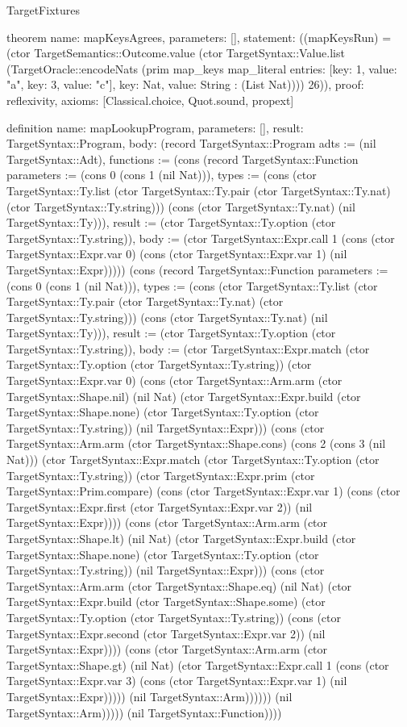 \begin{lexlean}{TargetFixtures}
\begin{semanticmodule}
theorem{
  name: mapKeysAgrees,
  parameters: [],
  statement: ((mapKeysRun) = (ctor TargetSemantics::Outcome.value (ctor TargetSyntax::Value.list (TargetOracle::encodeNats (prim map_keys map_literal{
    entries: [{key: 1, value: "a"}, {key: 3, value: "c"}],
    key: Nat,
    value: String
  } : (List Nat)))) 26)),
  proof: reflexivity{},
  axioms: [Classical.choice, Quot.sound, propext]
}

definition{
  name: mapLookupProgram,
  parameters: [],
  result: TargetSyntax::Program,
  body: (record TargetSyntax::Program {adts := (nil TargetSyntax::Adt), functions := (cons (record TargetSyntax::Function {parameters := (cons 0 (cons 1 (nil Nat))), types := (cons (ctor TargetSyntax::Ty.list (ctor TargetSyntax::Ty.pair (ctor TargetSyntax::Ty.nat) (ctor TargetSyntax::Ty.string))) (cons (ctor TargetSyntax::Ty.nat) (nil TargetSyntax::Ty))), result := (ctor TargetSyntax::Ty.option (ctor TargetSyntax::Ty.string)), body := (ctor TargetSyntax::Expr.call 1 (cons (ctor TargetSyntax::Expr.var 0) (cons (ctor TargetSyntax::Expr.var 1) (nil TargetSyntax::Expr))))}) (cons (record TargetSyntax::Function {parameters := (cons 0 (cons 1 (nil Nat))), types := (cons (ctor TargetSyntax::Ty.list (ctor TargetSyntax::Ty.pair (ctor TargetSyntax::Ty.nat) (ctor TargetSyntax::Ty.string))) (cons (ctor TargetSyntax::Ty.nat) (nil TargetSyntax::Ty))), result := (ctor TargetSyntax::Ty.option (ctor TargetSyntax::Ty.string)), body := (ctor TargetSyntax::Expr.match (ctor TargetSyntax::Ty.option (ctor TargetSyntax::Ty.string)) (ctor TargetSyntax::Expr.var 0) (cons (ctor TargetSyntax::Arm.arm (ctor TargetSyntax::Shape.nil) (nil Nat) (ctor TargetSyntax::Expr.build (ctor TargetSyntax::Shape.none) (ctor TargetSyntax::Ty.option (ctor TargetSyntax::Ty.string)) (nil TargetSyntax::Expr))) (cons (ctor TargetSyntax::Arm.arm (ctor TargetSyntax::Shape.cons) (cons 2 (cons 3 (nil Nat))) (ctor TargetSyntax::Expr.match (ctor TargetSyntax::Ty.option (ctor TargetSyntax::Ty.string)) (ctor TargetSyntax::Expr.prim (ctor TargetSyntax::Prim.compare) (cons (ctor TargetSyntax::Expr.var 1) (cons (ctor TargetSyntax::Expr.first (ctor TargetSyntax::Expr.var 2)) (nil TargetSyntax::Expr)))) (cons (ctor TargetSyntax::Arm.arm (ctor TargetSyntax::Shape.lt) (nil Nat) (ctor TargetSyntax::Expr.build (ctor TargetSyntax::Shape.none) (ctor TargetSyntax::Ty.option (ctor TargetSyntax::Ty.string)) (nil TargetSyntax::Expr))) (cons (ctor TargetSyntax::Arm.arm (ctor TargetSyntax::Shape.eq) (nil Nat) (ctor TargetSyntax::Expr.build (ctor TargetSyntax::Shape.some) (ctor TargetSyntax::Ty.option (ctor TargetSyntax::Ty.string)) (cons (ctor TargetSyntax::Expr.second (ctor TargetSyntax::Expr.var 2)) (nil TargetSyntax::Expr)))) (cons (ctor TargetSyntax::Arm.arm (ctor TargetSyntax::Shape.gt) (nil Nat) (ctor TargetSyntax::Expr.call 1 (cons (ctor TargetSyntax::Expr.var 3) (cons (ctor TargetSyntax::Expr.var 1) (nil TargetSyntax::Expr))))) (nil TargetSyntax::Arm)))))) (nil TargetSyntax::Arm))))}) (nil TargetSyntax::Function)))})
}


\end{semanticmodule}
\end{lexlean}
